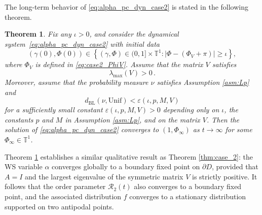 \documentclass[10pt]{article}
\newtheorem{theorem}{Theorem}[section]
\theoremstyle{definition}
\theoremstyle{definition}
\numberwithin{equation}{section}
\newcommand{\BBT}{\mathbb{T}}
\newcommand{\CR}{\mathcal{R}}
\newcommand{\lambdaMax}{\lambda_{\mathrm{max}}}
\newcommand{\BL}{\mathrm{BL}}
\newcommand{\PhiV}{\Phi_{V}}
\newcommand{\Unif}{\mathrm{Unif}}
\newcommand{\NGT}[1]{\marginpar{\scriptsize\textcolor{blue}{NGT: {#1}}}}
\begin{document}
The long-term behavior of \eqref{eq:alpha_pc_dyn_case2} is stated in the following theorem.
\begin{theorem}\label{thm:case_2stab}
Fix any $\iota > 0$, and consider the dynamical system~\eqref{eq:alpha_pc_dyn_case2} with initial data
\begin{equation}\label{eq:case2_stab_initial_data}
(\gamma(0), \Phi(0)) \in \left\{ (\gamma, \Phi) \in (0,1] \times \BBT^1: |\Phi - ( \PhiV + \pi)| \geq \iota \right\},
\end{equation}
where $\PhiV$ is defined in \eqref{eq:case2_PhiV}.
Assume that the matrix $V$ satisfies 
\begin{equation}\label{eq:case_2_stab_V_condi}
\lambdaMax(V) > 0 \, .
\end{equation}
Moreover, assume that the probability measure $\nu$ satisfies Assumption \ref{asm:Lp} and
\begin{equation}\label{eq:case_2_stab_close_to_unif}
 d_{\BL} (\nu, \Unif) < \varepsilon(\iota, p, M, V)
\end{equation}
for a sufficiently small constant $\varepsilon(\iota, p, M, V) > 0$ depending only on $\iota$, the constants $p$ and $M$ in Assumption \ref{asm:Lp}, and on the matrix $V$.
Then the solution of \eqref{eq:alpha_pc_dyn_case2} converges to $(1, \Phi_{\infty})$ as $t \rightarrow \infty$ for some $\Phi_{\infty} \in \BBT^1$.
\end{theorem}

Theorem \ref{thm:case_2stab} establishes a similar qualitative result as Theorem \ref{thm:case_2}: the WS variable $\alpha$ converges globally to a boundary fixed point on $\partial D$, provided that $A = I$ and the largest eigenvalue of the symmetric matrix $V$ is strictly positive. It follows that the order parameter $\CR_2(t)$ also converges to a boundary fixed point, and the associated distribution $f$ converges to a stationary distribution supported on two antipodal points.
\end{document}
